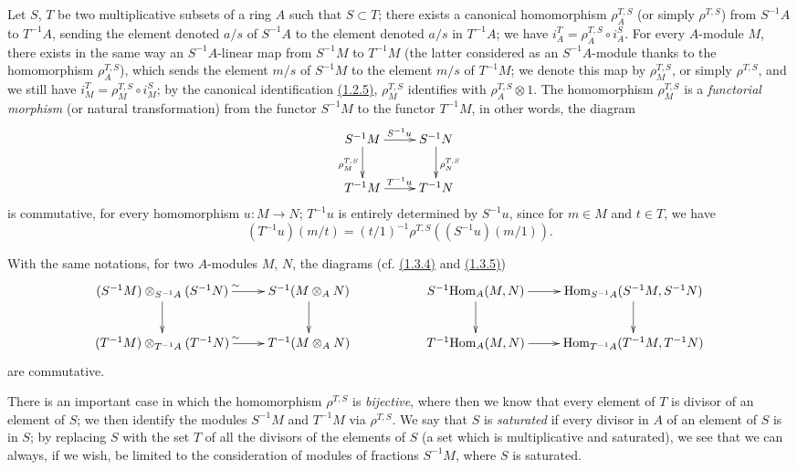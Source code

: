 \begin{env}[1.4.1]
\label{env-0.1.4.1}
Let $S$, $T$ be two multiplicative subsets of a ring $A$ such that $S\subset T$;
there exists a canonical homomorphism $\rho_A^{T,S}$ (or simply $\rho^{T,S}$)
from $S^{-1}A$ to $T^{-1}A$, sending the element denoted $a/s$ of $S^{-1}A$ to
the element denoted $a/s$ in $T^{-1}A$; we have $i_A^T=\rho_A^{T,S}\circ i_A^S$.
For every $A$-module $M$, there exists in the same way an $S^{-1}A$-linear map
from $S^{-1}M$ to $T^{-1}M$ (the latter considered as an $S^{-1}A$-module thanks
to the homomorphism $\rho_A^{T,S}$), which sends the element $m/s$ of $S^{-1}M$
to the element $m/s$ of $T^{-1}M$; we denote this map by $\rho_M^{T,S}$, or
simply $\rho^{T,S}$, and we still have $i_M^T=\rho_M^{T,S}\circ i_M^S$; by the
canonical identification \hyperref[env-0.1.2.5]{(1.2.5)}, $\rho_M^{T,S}$ identifies with
$\rho_A^{T,S}\otimes 1$. The homomorphism $\rho_M^{T,S}$ is a {\em functorial
morphism} (or natural transformation) from the functor $S^{-1}M$ to the functor
$T^{-1}M$, in other words, the diagram
\[
  \xymatrix{
  S^{-1}M\ar[r]^{S^{-1}u}\ar[d]_{\rho_M^{T,S}} &
  S^{-1}N\ar[d]^{\rho_N^{T,S}}\\
  T^{-1}M\ar[r]^{T^{-1}u} &
  T^{-1}N
  }
\]
is commutative, for every homomorphism $u:M\to N$; $T^{-1}u$ is entirely
determined by $S^{-1}u$, since for $m\in M$ and $t\in T$, we have
\[
  (T^{-1}u)(m/t)=(t/1)^{-1}\rho^{T,S}((S^{-1}u)(m/1)).
\]
\end{env}

\begin{env}[1.4.2]
\label{env-0.1.4.2}
With the same notations, for two $A$-modules $M$, $N$, the diagrams
(cf. \hyperref[env-0.1.3.4]{(1.3.4)} and \hyperref[env-0.1.3.5]{(1.3.5)})
\[
  \xymatrix{
    (S^{-1}M)\otimes_{S^{-1}A}(S^{-1}N)\ar[r]^\sim \ar[d] &
    S^{-1}(M\otimes_A N)\ar[d] & &
    S^{-1}\Hom_A(M,N)\ar[r]\ar[d] &
    \Hom_{S^{-1}A}(S^{-1}M,S^{-1}N)\ar[d]\\
    (T^{-1}M)\otimes_{T^{-1}A}(T^{-1}N)\ar[r]^\sim &
    T^{-1}(M\otimes_A N) & &
    T^{-1}\Hom_A(M,N)\ar[r] &
    \Hom_{T^{-1}A}(T^{-1}M,T^{-1}N)
  }
\]
are commutative.
\end{env}

\begin{env}[1.4.3]
\label{env-0.1.4.3}
There is an important case in which the homomorphism $\rho^{T,S}$ is
{\em bijective}, where then we know that every element of $T$ is divisor of an
element of $S$; we then identify the modules $S^{-1}M$ and $T^{-1}M$ via
$\rho^{T,S}$. We say that $S$ is {\em saturated} if every divisor in $A$ of an
element of $S$ is in $S$; by replacing $S$ with the set $T$ of all the divisors
of the elements of $S$ (a set which is multiplicative and saturated), we see
that we can always, if we wish, be limited to the consideration of modules of
fractions $S^{-1}M$, where $S$ is saturated.
\end{env}

